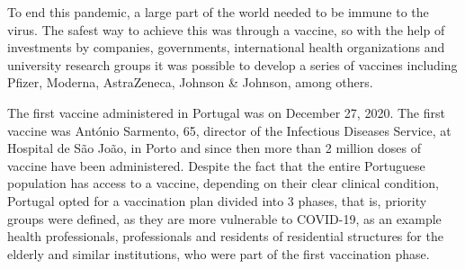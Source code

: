 
   To end this pandemic, a large part of the world needed to be immune to the virus. The safest way to achieve this was through a vaccine, so with the help of investments by companies, governments, international health organizations and university research groups it was possible to develop a series of vaccines including Pfizer, Moderna, AstraZeneca, Johnson & Johnson, among others.

   The first vaccine administered in Portugal was on December 27, 2020. The first vaccine was António Sarmento, 65, director of the Infectious Diseases Service, at Hospital de São João, in Porto and since then more than 2 million doses of vaccine have been administered. Despite the fact that the entire Portuguese population has access to a vaccine, depending on their clear clinical condition, Portugal opted for a vaccination plan divided into 3 phases, that is, priority groups were defined, as they are more vulnerable to COVID-19, as an example health professionals, professionals and residents of residential structures for the elderly and similar institutions, who were part of the first vaccination phase.
